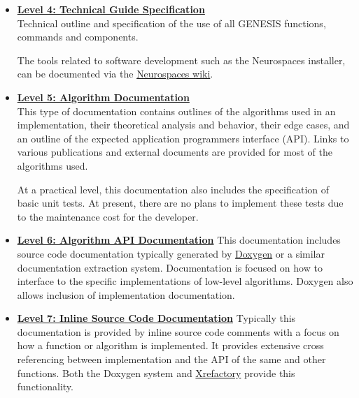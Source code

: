 \documentclass[12pt]{article}
\begin{document}
\begin{itemize}
\item[]\href{../contents-level4/contents-level4.tex}{\bf Level 4: Technical Guide Specification}\\
  Technical outline and specification of the use of all GENESIS
  functions, commands and components.

  The tools related to software development such as the Neurospaces
  installer, can be documented via the
  \href{http://code.google.com/p/neurospaces/wiki/Index}{Neurospaces
    wiki}.

\item[]\href{../contents-level5/contents-level5.tex}{\bf Level 5: Algorithm Documentation} \\
  This type of documentation contains outlines of the algorithms used
  in an implementation, their theoretical analysis and behavior, their
  edge cases, and an outline of the expected application programmers
  interface (API).  Links to various publications and external
  documents are provided for most of the algorithms used.

  At a practical level, this documentation also includes the
  specification of basic unit tests.  At present, there are no plans
  to implement these tests due to the maintenance cost for the
  developer.

\item[]\href{http://www.neurospaces.org/doxygen-menu.html}{\bf Level 6: Algorithm API Documentation}
  This documentation includes source code documentation typically
  generated by \href{http://www.stack.nl/~dimitri/doxygen/}{Doxygen}
  or a similar documentation extraction system.  Documentation is
  focused on how to interface to the specific implementations of
  low-level algorithms. Doxygen also allows inclusion of
  implementation documentation.

\item[]\href{http://www.neurospaces.org/cxref-menu.html}{\bf Level 7: Inline Source Code Documentation}
  Typically this documentation is provided by inline source code
  comments with a focus on how a function or algorithm is implemented.
  It provides extensive cross referencing between implementation and
  the API of the same and other functions.
  Both the Doxygen system and \href {http://www.xref.sk/xrefactory/main.html}{Xrefactory} provide this
  functionality.
  
\end{itemize}
\end{document}
